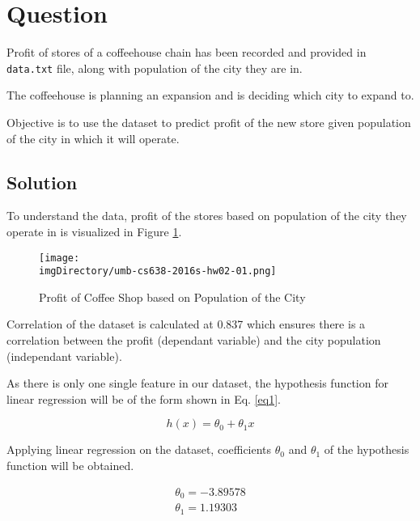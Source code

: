 \documentclass[12pt,letterpaper,twoside]{article}
\begin{document}

\makeHeader

\section*{Question}

Profit of stores of a coffeehouse chain has been recorded and provided in \texttt{data.txt} file, along with population of the city they are in.

The coffeehouse is planning an expansion and is deciding which city to expand to.

Objective is to use the dataset to predict profit of the new store given population of the city in which it will operate.

\subsection*{Solution}

To understand the data, profit of the stores based on population of the city they operate in is visualized in Figure \ref{fig1}.

\begin{figure}[H]\centering
\texttt{[image: \\imgDirectory/umb-cs638-2016s-hw02-01.png]}
\caption{Profit of Coffee Shop based on Population of the City}\label{fig1}
\end{figure}

Correlation of the dataset is calculated at 0.837 which ensures there is a correlation between the profit (dependant variable) and the city population (independant variable).

As there is only one single feature in our dataset, the hypothesis function for linear regression will be of the form shown in Eq. \ref{eq1}.

\begin{equation}\label{eq1}
h(x) = \theta_0 + \theta_1 x
\end{equation}

Applying linear regression on the dataset, coefficients $\theta_0$ and $\theta_1$ of the hypothesis function will be obtained.

\begin{equation}\label{eq2}
\begin{split}
\theta_0 = -3.89578\\
\theta_1 = 1.19303
\end{split}
\end{equation}
\end{document}

